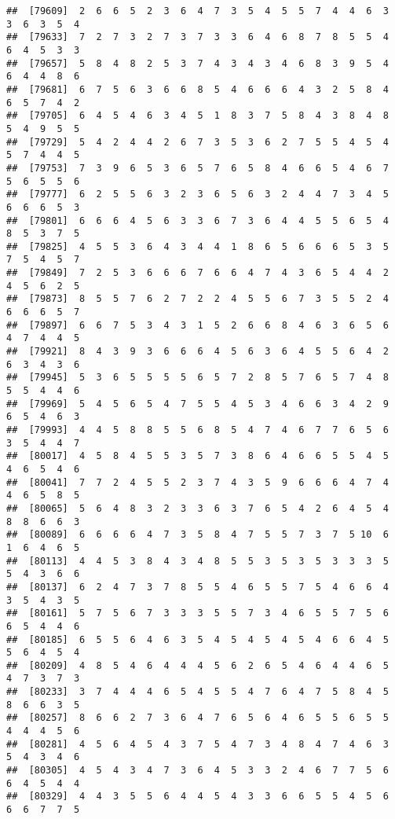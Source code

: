 \documentclass[
]{book}
\begin{document}
\begin{verbatim}
##  [79609]  2  6  6  5  2  3  6  4  7  3  5  4  5  5  7  4  4  6  3  3  6  3  5  4
##  [79633]  7  2  7  3  2  7  3  7  3  3  6  4  6  8  7  8  5  5  4  6  4  5  3  3
##  [79657]  5  8  4  8  2  5  3  7  4  3  4  3  4  6  8  3  9  5  4  6  4  4  8  6
##  [79681]  6  7  5  6  3  6  6  8  5  4  6  6  6  4  3  2  5  8  4  6  5  7  4  2
##  [79705]  6  4  5  4  6  3  4  5  1  8  3  7  5  8  4  3  8  4  8  5  4  9  5  5
##  [79729]  5  4  2  4  4  2  6  7  3  5  3  6  2  7  5  5  4  5  4  5  7  4  4  5
##  [79753]  7  3  9  6  5  3  6  5  7  6  5  8  4  6  6  5  4  6  7  5  6  5  5  6
##  [79777]  6  2  5  5  6  3  2  3  6  5  6  3  2  4  4  7  3  4  5  6  6  6  5  3
##  [79801]  6  6  6  4  5  6  3  3  6  7  3  6  4  4  5  5  6  5  4  8  5  3  7  5
##  [79825]  4  5  5  3  6  4  3  4  4  1  8  6  5  6  6  6  5  3  5  7  5  4  5  7
##  [79849]  7  2  5  3  6  6  6  7  6  6  4  7  4  3  6  5  4  4  2  4  5  6  2  5
##  [79873]  8  5  5  7  6  2  7  2  2  4  5  5  6  7  3  5  5  2  4  6  6  6  5  7
##  [79897]  6  6  7  5  3  4  3  1  5  2  6  6  8  4  6  3  6  5  6  4  7  4  4  5
##  [79921]  8  4  3  9  3  6  6  6  4  5  6  3  6  4  5  5  6  4  2  6  3  4  3  6
##  [79945]  5  3  6  5  5  5  5  6  5  7  2  8  5  7  6  5  7  4  8  5  5  4  4  6
##  [79969]  5  4  5  6  5  4  7  5  5  4  5  3  4  6  6  3  4  2  9  6  5  4  6  3
##  [79993]  4  4  5  8  8  5  5  6  8  5  4  7  4  6  7  7  6  5  6  3  5  4  4  7
##  [80017]  4  5  8  4  5  5  3  5  7  3  8  6  4  6  6  5  5  4  5  4  6  5  4  6
##  [80041]  7  7  2  4  5  5  2  3  7  4  3  5  9  6  6  6  4  7  4  4  6  5  8  5
##  [80065]  5  6  4  8  3  2  3  3  6  3  7  6  5  4  2  6  4  5  4  8  8  6  6  3
##  [80089]  6  6  6  6  4  7  3  5  8  4  7  5  5  7  3  7  5 10  6  1  6  4  6  5
##  [80113]  4  4  5  3  8  4  3  4  8  5  5  3  5  3  5  3  3  3  5  5  4  3  6  6
##  [80137]  6  2  4  7  3  7  8  5  5  4  6  5  5  7  5  4  6  6  4  3  5  4  3  5
##  [80161]  5  7  5  6  7  3  3  3  5  5  7  3  4  6  5  5  7  5  6  6  5  4  4  6
##  [80185]  6  5  5  6  4  6  3  5  4  5  4  5  4  5  4  6  6  4  5  5  6  4  5  4
##  [80209]  4  8  5  4  6  4  4  4  5  6  2  6  5  4  6  4  4  6  5  4  7  3  7  3
##  [80233]  3  7  4  4  4  6  5  4  5  5  4  7  6  4  7  5  8  4  5  8  6  6  3  5
##  [80257]  8  6  6  2  7  3  6  4  7  6  5  6  4  6  5  5  6  5  5  4  4  4  5  6
##  [80281]  4  5  6  4  5  4  3  7  5  4  7  3  4  8  4  7  4  6  3  5  4  3  4  6
##  [80305]  4  5  4  3  4  7  3  6  4  5  3  3  2  4  6  7  7  5  6  6  4  5  4  4
##  [80329]  4  4  3  5  5  6  4  4  5  4  3  3  6  6  5  5  4  5  6  6  6  7  7  5

\end{verbatim}
\end{document}
